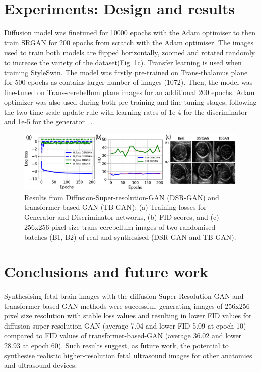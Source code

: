 \documentclass{midl} %
\begin{document}
\section{Experiments: Design and results}
Diffusion model was finetuned for 10000 epochs with the Adam optimiser to then train SRGAN for 200 epochs from scratch with the Adam optimiser. The images used to train both models are flipped horizontally, zoomed and rotated randomly to increase the variety of the dataset(Fig~\ref{fig:main_results}c).
Transfer learning is used when training StyleSwin. The model was firstly pre-trained on Trans-thalamus plane for 500 epochs as contains larger number of images (1072). Then, the model was fine-tuned on Trans-cerebellum plane images for an additional 200 epochs. Adam optimizer was also used during both pre-training and fine-tuning stages, following the two time-scale update rule with learning rates of 1e-4 for the discriminator and 1e-5 for the generator ~\cite{Heuvel2018}. 
\begin{figure}[htbp]
    \centering
    \includegraphics[width=0.99\textwidth]{main-fig-results.png} %
\caption{
	Results from Diffusion-Super-resolution-GAN (DSR-GAN) and transformer-based-GAN (TB-GAN):
	(a) Training losses for Generator and Discriminator networks,
	(b) FID scores, and
	(c) 256x256 pixel size trans-cerebellum images of two randomised batches (B1, B2) of real and synthesised (DSR-GAN and TB-GAN).
    }
\label{fig:main_results}
\end{figure}    

\section{Conclusions and future work}
Synthesising fetal brain images with the diffusion-Super-Resolution-GAN and transformer-based-GAN methods were successful, generating images of 256x256 pixel size resolution with stable loss values and 
resulting in lower FID values for diffusion-super-resolution-GAN (average 7.04 and lower FID 5.09 at epoch 10) compared to FID values of transformer-based-GAN (average 36.02 and lower 28.93 at epoch 60).
Such results suggest, as future work, the potential to synthesise realistic higher-resolution fetal ultrasound images for other anatomies and ultrasound-devices.




\end{document}
